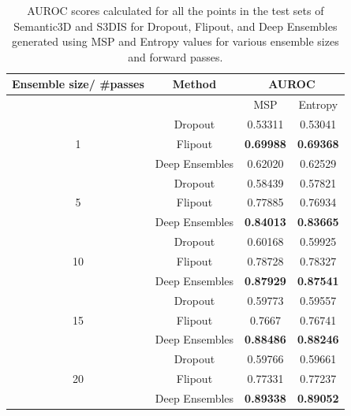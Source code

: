     \begin{table}[h!]
        \centering
        \begin{tabular}{cccc}
        \hline
        Ensemble size/ \#passes & Method               &  \multicolumn{2}{c}{AUROC}          \\ \hline
                                &                      &  MSP              & Entropy         \\ \hline
        \multirow{3}{*}{1}      & Dropout              & 0.53311          & 0.53041          \\
                                & Flipout              & \textbf{0.69988} & \textbf{0.69368} \\
                                & Deep Ensembles       & 0.62020          & 0.62529          \\ \hline
        \multirow{3}{*}{5}      & Dropout              & 0.58439          & 0.57821          \\
                                & Flipout              & 0.77885          & 0.76934          \\
                                & Deep Ensembles       & \textbf{0.84013} & \textbf{0.83665} \\ \hline
        \multirow{3}{*}{10}     & Dropout              & 0.60168          & 0.59925          \\
                                & Flipout              & 0.78728          & 0.78327          \\
                                & Deep Ensembles       & \textbf{0.87929} & \textbf{0.87541} \\ \hline
        \multirow{3}{*}{15}     & Dropout              & 0.59773          & 0.59557          \\
                                & Flipout              & 0.7667           & 0.76741          \\
                                & Deep Ensembles       & \textbf{0.88486} & \textbf{0.88246} \\ \hline
        \multirow{3}{*}{20}     & Dropout              & 0.59766          & 0.59661          \\
                                & Flipout              & 0.77331          & 0.77237          \\
                                & Deep Ensembles       & \textbf{0.89338} & \textbf{0.89052} \\ \hline
        \end{tabular}
        \caption{AUROC scores calculated for all the points in the test sets of Semantic3D and S3DIS for Dropout, Flipout, and  Deep Ensembles generated using MSP and Entropy values for various ensemble sizes and forward passes.}
        \label{tab:sem3dvs3dis_auroc}
    \end{table}
